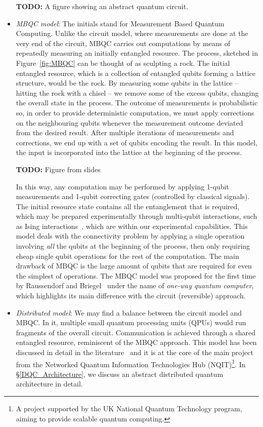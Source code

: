 \begin{itemize}
  \textbf{TODO:} A figure showing an abstract quantum circuit.

  \item \textit{MBQC model}: The initials stand for Measurement Based Quantum Computing. Unlike the circuit model, where measurements are done at the very end of the circuit, MBQC carries out computations by means of repeatedly measuring an initially entangled resource. The process, sketched in Figure~\ref{fig:MBQC} can be thought of as sculpting a rock. The initial entangled resource, which is a collection of entangled qubits forming a lattice structure, would be the rock. By measuring some qubits in the lattice -- hitting the rock with a chisel -- we remove some of the excess qubits, changing the overall state in the process. The outcome of measurements is probabilistic so, in order to provide deterministic computation, we must apply corrections on the neighbouring qubits whenever the measurement outcome deviated from the desired result. After multiple iterations of measurements and corrections, we end up with a set of qubits encoding the result. In this model, the input is incorporated into the lattice at the beginning of the process.

  \textbf{TODO:} Figure from slides %

  In this way, any computation may be performed by applying 1-qubit measurements and 1-qubit correcting gates (controlled by classical signals). The initial resource state contains all the entanglement that is required, which may be prepared experimentally through multi-qubit interactions, such as Ising interactions~\citep{1WQC}, which are within our experimental capabilities. This model deals with the connectivity problem by applying a single operation involving \textit{all} the qubits at the beginning of the process, then only requiring cheap single qubit operations for the rest of the computation. The main drawback of MBQC is the large amount of qubits that are required for even the simplest of operations. The MBQC model was proposed for the first time by Raussendorf and Briegel~\citep{1WQC} under the name of \textit{one-way quantum computer}, which highlights its main difference with the circuit (reversible) approach. 

  \item \textit{Distributed model}: We may find a balance between the circuit model and MBQC. In it, multiple small quantum processing units (QPUs) would run fragments of the overall circuit. Communication is achieved through a shared entangled resource, reminiscent of the MBQC approach. This model has been discussed in detail in the literature~\citep{DistributedQCHW} and it is at the core of the main project from the Networked Quantum Information Technologies Hub (NQIT)\footnote{A project supported by the UK National Quantum Technology program, aiming to provide scalable quantum computing.}. In \S\ref{DQC_Architecture}, we discuss an abstract distributed quantum architecture in detail.

\end{itemize}


